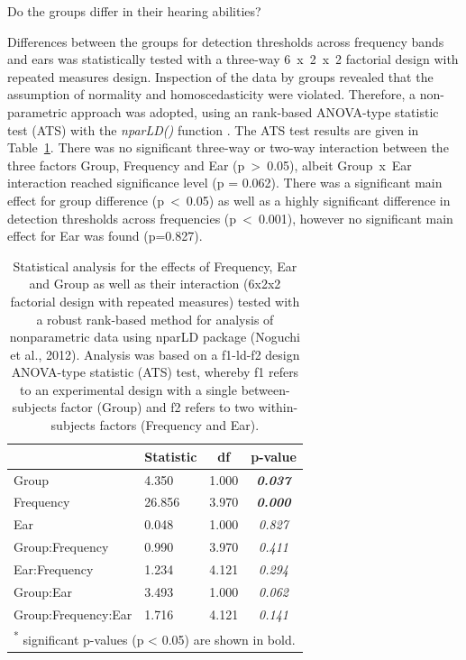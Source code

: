 \documentclass[a4paper, twoside]{templates/ociamthesis}
\begin{document}
\colorbox[HTML]{CCCCFF}{Do the groups differ in their hearing abilities?}

Differences between the groups for detection thresholds across frequency bands and ears was statistically tested with a three-way 6~x~2~x~2 factorial design with repeated measures design. Inspection of the data by groups revealed that the assumption of normality and homoscedasticity were violated. Therefore, a non-parametric approach was adopted, using an rank-based ANOVA-type statistic test (ATS) with the \emph{nparLD()} function \autocite[nparLD package ;][]{nparLDPackageR}. The ATS test results are given in Table~\ref{tab:RegAud-TabnparLD}. There was no significant three-way or two-way interaction between the three factors Group, Frequency and Ear (p~\textgreater~0.05), albeit Group~x~Ear interaction reached significance level (p = 0.062). There was a significant main effect for group difference (p~\textless~0.05) as well as a highly significant difference in detection thresholds across frequencies (p~\textless~0.001), however no significant main effect for Ear was found (p=0.827).

\begin{table}

\caption{\label{tab:RegAud-TabnparLD}Statistical analysis for the effects of Frequency, Ear and Group as well as their interaction (6x2x2 factorial design with repeated measures) tested with a robust rank-based method for analysis of nonparametric data using nparLD package (Noguchi et al., 2012). Analysis was based on a f1-ld-f2 design ANOVA-type statistic (ATS) test, whereby f1 refers to an experimental design with a single between-subjects factor (Group) and f2 refers to two within-subjects factors (Frequency and Ear).}
\centering
\begin{tabular}[t]{llc>{}c}
\toprule
  & Statistic & df & p-value\\
\midrule
Group & 4.350 & 1.000 & \em{\textbf{0.037}}\\
Frequency & 26.856 & 3.970 & \em{\textbf{0.000}}\\
Ear & 0.048 & 1.000 & \em{0.827}\\
Group:Frequency & 0.990 & 3.970 & \em{0.411}\\
Ear:Frequency & 1.234 & 4.121 & \em{0.294}\\
Group:Ear & 3.493 & 1.000 & \em{0.062}\\
Group:Frequency:Ear & 1.716 & 4.121 & \em{0.141}\\
\bottomrule
\multicolumn{4}{l}{\textsuperscript{*} significant p-values (p < 0.05) are shown in bold.}\\
\end{tabular}
\end{table}
\end{document}
